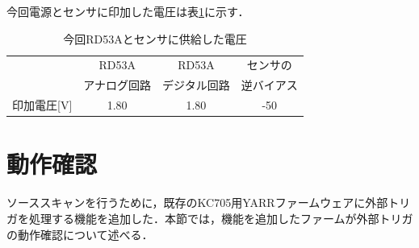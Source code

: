 今回電源とセンサに印加した電圧は表\ref{tab:voltage}に示す．

\begin{table}[h]
  \centering
  \caption{今回RD53Aとセンサに供給した電圧}
  \begin{tabular} {l|cc|c} \hline
     & RD53A & RD53A & センサの \\ 
     & アナログ回路 & デジタル回路 & 逆バイアス \\ \hline \hline
    印加電圧[$\mathrm{V}$] & 1.80 & 1.80 & -50 \\ \hline
  \end{tabular}
  \label{tab:voltage}
\end{table}



\section{動作確認}
\label{sec:scans}
ソーススキャンを行うために，既存のKC705用YARRファームウェアに外部トリガを処理する機能を追加した．本節では，機能を追加したファームが外部トリガの動作確認について述べる．

%
%
